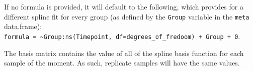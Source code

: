 \documentclass[9pt,a4paper,]{extarticle}
\newenvironment{Shaded}{\begin{snugshade}}{\end{snugshade}}
\newcommand{\KeywordTok}[1]{\textcolor[rgb]{0.13,0.29,0.53}{\textbf{#1}}}
\newcommand{\NormalTok}[1]{#1}
\newcommand{\OperatorTok}[1]{\textcolor[rgb]{0.81,0.36,0.00}{\textbf{#1}}}
\begin{document}
If no formula is provided, it will default to the following, which provides
for a different spline fit for every group (as defined by the \texttt{Group} variable
in the \texttt{meta} data.frame):
\texttt{formula\ =\ \textasciitilde{}Group:ns(Timepoint,\ df=degrees\_of\_fredoom)\ +\ Group\ +\ 0}.

The basis matrix contains the value of all of the spline basis function for
each sample of the moment. As such, replicate samples will have the same
values.

\begin{Shaded}
\end{Shaded}
\end{document}
